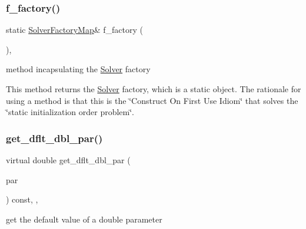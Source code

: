 \subsubsection{\texorpdfstring{f\+\_\+factory()}{f\_factory()}}
{\footnotesize\ttfamily static \mbox{\hyperlink{class_s_m_spp__di__unipi__it_1_1_solver_a648aad605b7d80ef4469835bb60fc6c4}{Solver\+Factory\+Map}}\& f\+\_\+factory (\begin{DoxyParamCaption}\item[{void}]{ }\end{DoxyParamCaption})\hspace{0.3cm}{\ttfamily [static]}, {\ttfamily [protected]}}



method incapsulating the \mbox{\hyperlink{class_s_m_spp__di__unipi__it_1_1_solver}{Solver}} factory 

This method returns the \mbox{\hyperlink{class_s_m_spp__di__unipi__it_1_1_solver}{Solver}} factory, which is a static object. The rationale for using a method is that this is the \char`\"{}\+Construct On First
\+Use Idiom\char`\"{} that solves the \char`\"{}static initialization order problem\char`\"{}. \mbox{\label{class_s_m_spp__di__unipi__it_1_1_solver_a465a771c115acf8d5f4e32e22f003014}} 
\subsubsection{\texorpdfstring{get\+\_\+dflt\+\_\+dbl\+\_\+par()}{get\_dflt\_dbl\_par()}}
{\footnotesize\ttfamily virtual double get\+\_\+dflt\+\_\+dbl\+\_\+par (\begin{DoxyParamCaption}\item[{const \mbox{\hyperlink{class_s_m_spp__di__unipi__it_1_1_thin_compute_interface_aa3d710629ad8c434286726ad810c3b47}{idx\+\_\+type}}}]{par }\end{DoxyParamCaption}) const\hspace{0.3cm}{\ttfamily [inline]}, {\ttfamily [override]}, {\ttfamily [virtual]}}



get the default value of a double parameter 

